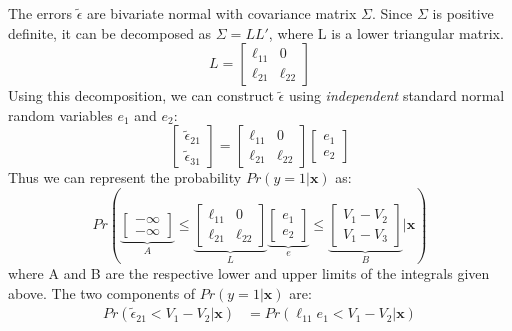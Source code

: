 \documentclass[DIV=14,titlepage=false]{scrreprt}
\begin{document}
\begin{example}
    The errors $\tilde \epsilon$ are bivariate normal with covariance matrix $\Sigma$. Since $\Sigma$ is positive definite, it can be decomposed as $\Sigma = LL'$, where L is a lower triangular matrix.
    \[ L =
        \begin{bmatrix}
        \ell_{11} & 0 \\
        \ell_{21} & \ell_{22}
        \end{bmatrix} 
    \]
    Using this decomposition, we can construct $\tilde \epsilon$ using \textit{independent} standard normal random variables $e_1$ and $e_2$:
    \[
        \begin{bmatrix}
            \tilde \epsilon_{21} \\
            \tilde \epsilon_{31}
        \end{bmatrix} =
        \begin{bmatrix}
            \ell_{11} & 0 \\
            \ell_{21} & \ell_{22}
        \end{bmatrix}
        \begin{bmatrix}
            e_1 \\
            e_2
        \end{bmatrix}
    \]
    Thus we can represent the probability $Pr(y = 1|\mathbf{x})$ as:
    \[ Pr \left(
        \underbrace{\begin{bmatrix}
            -\infty\\
            - \infty
        \end{bmatrix}}_A
        \leq
        \underbrace{\begin{bmatrix}
            \ell_{11} & 0 \\
            \ell_{21} & \ell_{22}
        \end{bmatrix}}_L
        \underbrace{\begin{bmatrix}
            e_1 \\
            e_2
        \end{bmatrix}}_e
        \leq 
        \underbrace{\begin{bmatrix}
            V_1 - V_2 \\
            V_1 - V_3
        \end{bmatrix}}_B |\mathbf{x}\right)
    \]
    where A and B are the respective lower and upper limits of the integrals given above. The two components of $Pr(y=1|\mathbf{x})$ are:
    \begin{align*}
        Pr(\tilde \epsilon_{21} < V_1 - V_2|\mathbf{x}) &= Pr(\ell_{11}e_1 < V_1 - V_2|\mathbf{x}) \\

\end{align*}
\end{example}
\end{document}
